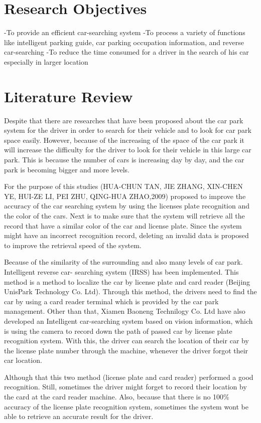 \documentclass[12pt]{article}
\begin{document}
\section{Research Objectives}
-To provide an efficient car-searching system
-To process a variety of functions like intelligent parking guide, car parking occupation information, and reverse car-searching
-To reduce the time consumed for a driver in the search of his car especially in larger location

\section{Literature Review}
Despite that there are researches that have been proposed about the car park system for the driver in order to search for their vehicle and to look for car park space easily. However, because of the increasing of the space of the car park it will increase the difficulty for the driver to look for their vehicle in this large car park. This is because the number of cars is increasing day by day, and the car park is becoming bigger and more levels. 

For the purpose of this studies (HUA-CHUN TAN, JIE ZHANG, XIN-CHEN YE, HUI-ZE LI, PEI ZHU, QING-HUA ZHAO,2009) proposed to improve the accuracy of the car searching system by using the licenses plate recognition and the color of the cars.\cite{a} Next is to make sure that the system will retrieve all the record that have a similar color of the car and license plate. Since the system might have an incorrect recognition record, deleting an invalid data is proposed to improve the retrieval speed of the system.
	
Because of the similarity of the surrounding and also many levels of car park. Intelligent reverse car- searching system (IRSS) has been implemented. This method is a method to localize the car by license plate and card reader (Beijing UnisPark Technology Co. Ltd)\cite{b}. Through this method, the drivers need to find the car by using a card reader terminal which is provided by the car park management. Other than that, Xiamen Baoneng Technilogy Co.\cite{c} Ltd have also developed an Intelligent car-searching system based on vision information, which is using the camera to record down the path of passed car by license plate recognition system. With this, the driver can search the location of their car by the license plate number through the machine, whenever the driver forgot their car location.

Although that this two method (license plate and card reader) performed a good recognition. Still, sometimes the driver might forget to record their location by the card at the card reader machine. Also, because that there is no 100\% accuracy of the license plate recognition system, sometimes the system wont be able to retrieve an accurate result for the driver. 
\end{document}
